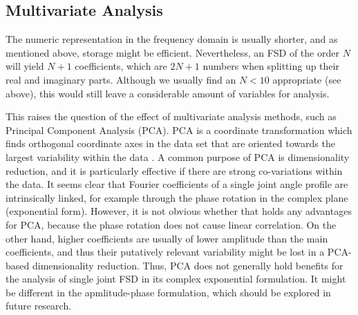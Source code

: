 \subsection{Multivariate Analysis}
\label{sec:org7027b53}
The numeric representation in the frequency domain is usually shorter, and as mentioned above, storage might be efficient.
Nevertheless, an FSD of the order \(N\) will yield \(N+1\) coefficients, which are \(2N+1\) numbers when splitting up their real and imaginary parts.
Although we usually find an \(N<10\) appropriate (see above), this would still leave a considerable amount of variables for analysis.

This raises the question of the effect of multivariate analysis methods, such as Principal Component Analysis (PCA).
PCA is a coordinate transformation which finds orthogonal coordinate axes in the data set that are oriented towards the largest variability within the data \citep{MacLeod2007}.
A common purpose of PCA is dimensionality reduction, and it is particularly effective if there are strong co-variations within the data.
It seems clear that Fourier coefficients of a single joint angle profile are intrinsically linked, for example through the phase rotation in the complex plane (exponential form).
However, it is not obvious whether that holds any advantages for PCA, because the phase rotation does not cause linear correlation.
On the other hand, higher coefficients are usually of lower amplitude than the main coefficients, and thus their putatively relevant variability might be lost in a PCA-based dimensionality reduction.
Thus, PCA does not generally hold benefits for the analysis of single joint FSD in its complex exponential formulation.
It might be different in the apmlitude-phase formulation, which should be explored in future research.


